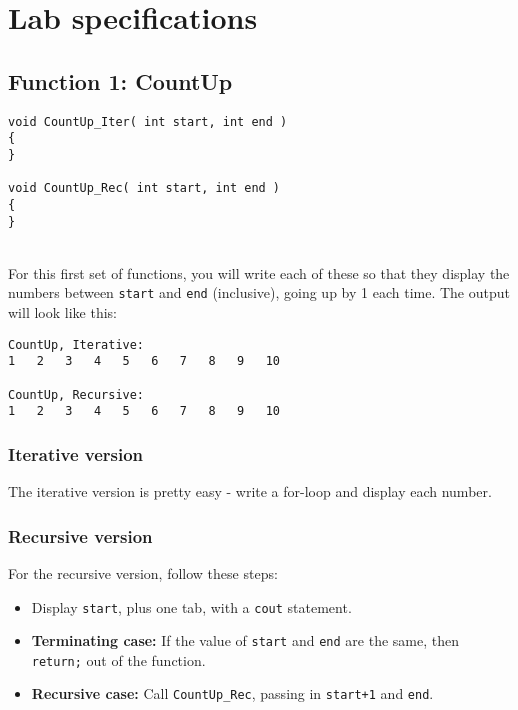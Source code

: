 \newpage


\section{Lab specifications}

\subsection{Function 1: CountUp}

\begin{lstlisting}[style=code]
void CountUp_Iter( int start, int end )
{
}

void CountUp_Rec( int start, int end )
{
}
\end{lstlisting}

~\\

For this first set of functions, you will write each of these so that
they display the numbers between \texttt{start} and \texttt{end} (inclusive),
going up by 1 each time. The output will look like this:

\begin{lstlisting}[style=output]
CountUp, Iterative:
1	2	3	4	5	6	7	8	9	10

CountUp, Recursive:
1	2	3	4	5	6	7	8	9	10 
\end{lstlisting}

\subsubsection{Iterative version}

The iterative version is pretty easy - write a for-loop and display each number.

\subsubsection{Recursive version}

For the recursive version, follow these steps:

\begin{itemize}
    \item   Display \texttt{start}, plus one tab, with a \texttt{cout} statement.
    \item   \textbf{Terminating case:}
                If the value of \texttt{start} and \texttt{end} are the same,
                then \texttt{return;} out of the function.
    \item   \textbf{Recursive case:}
                Call \texttt{CountUp\_Rec}, passing in \texttt{start+1} and \texttt{end}.
\end{itemize}

